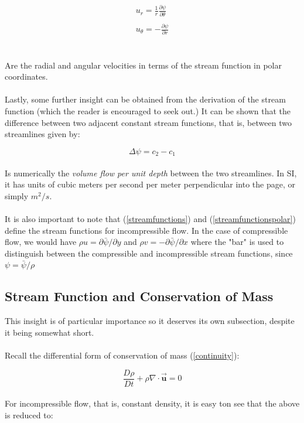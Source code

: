 \documentclass[11pt]{article}
\begin{document}
\begin{equation}\label{streamfunctionspolar}
    \begin{matrix}
        u_r = \frac{1}{r}\frac{\partial\psi}{\partial\theta} \\ \\
        u_\theta = -\frac{\partial\psi}{\partial r}
    \end{matrix}
\end{equation}\\ \\
\noindent
Are the radial and angular velocities in terms of the stream function in polar coordinates.\\ \\
\noindent
Lastly, some further insight can be obtained from the derivation of the stream function (which the reader is encouraged to seek out.) It can be shown that the difference between two adjacent constant stream functions, that is, between two streamlines given by:

\begin{equation*}
    \Delta\psi = c_2 - c_1
\end{equation*}\\ 
\noindent
Is numerically the \emph{volume flow per unit depth} between the two streamlines. In SI, it has units of cubic meters per second per meter perpendicular into the page, or simply $m^2/s$.\\ \\
\noindent
It is also important to note that (\ref{streamfunctions}) and (\ref{streamfunctionspolar}) define the stream functions for incompressible flow. In the case of compressible flow, we would have $\rho u = \partial \bar{\psi} / \partial y$ and $\rho v = -\partial \bar{\psi} / \partial x$ where the "bar" is used to distinguish between the compressible and incompressible stream functions, since $\psi = \bar{\psi} / \rho$

\subsection{Stream Function and Conservation of Mass}
This insight is of particular importance so it deserves its own subsection, despite it being somewhat short. \\ \\
\noindent
Recall the differential form of conservation of mass (\ref{continuity}):

\begin{equation*}
    \frac{D\rho}{Dt} + \rho\nabla \cdot \vec{\bm{u}} = 0
\end{equation*}\\
\noindent
For incompressible flow, that is, constant density, it is easy ton see that the above is reduced to:
\end{document}
